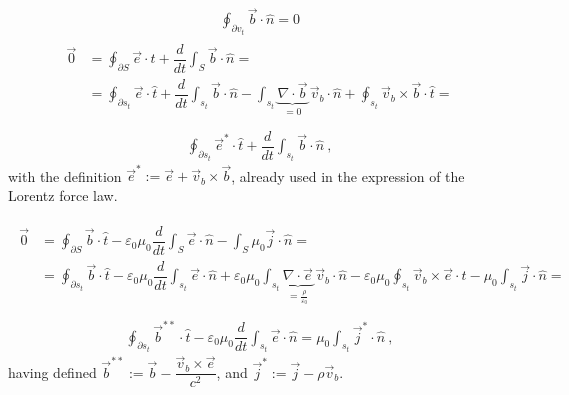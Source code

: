 \documentclass[letterpaper,10pt,english]{jupyterBook}
\begin{document}
\sphinxAtStartPar
{}
\begin{equation*}
\begin{split}
    \oint_{\partial v_t} \vec{b} \cdot \hat{n} = 0
\end{split}
\end{equation*}
\sphinxAtStartPar
{}
\begin{equation*}
\begin{split}\begin{aligned}
   \vec{0} & = \oint_{\partial S} \vec{e} \cdot \hat{t} + \dfrac{d}{dt} \int_{S} \vec{b} \cdot \hat{n} = \\
    & = \oint_{\partial s_t} \vec{e} \cdot \hat{t} + \dfrac{d}{dt} \int_{s_t} \vec{b} \cdot \hat{n} - \int_{s_t} \underbrace{\nabla \cdot \vec{b}}_{=0} \, \vec{v}_b \cdot \hat{n} + \oint_{s_t} \vec{v}_b \times \vec{b} \cdot \hat{t} =  \\
\end{aligned}\end{split}
\end{equation*}\begin{equation*}
\begin{split}
    \oint_{\partial s_t} \vec{e}^* \cdot \hat{t} + \dfrac{d}{dt} \int_{s_t} \vec{b} \cdot \hat{n} \ ,
\end{split}
\end{equation*}
\sphinxAtStartPar
with the definition \(\vec{e}^* := \vec{e} + \vec{v}_b \times \vec{b}\), already used in the expression of the Lorentz force law.

\sphinxAtStartPar
{}
\begin{equation*}
\begin{split}\begin{aligned}
    \vec{0} & = \oint_{\partial S} \vec{b} \cdot \hat{t} - \varepsilon_0 \mu_0 \dfrac{d}{dt} \int_{S}  \vec{e} \cdot \hat{n} - \int_{S} \mu_0 \vec{j} \cdot \hat{n} = \\
    & = \oint_{\partial s_t} \vec{b} \cdot \hat{t} - \varepsilon_0 \mu_0 \dfrac{d}{dt} \int_{s_t} \vec{e} \cdot \hat{n} + \varepsilon_0 \mu_0 \int_{s_t} \underbrace{\nabla \cdot \vec{e}}_{=\frac{\rho}{\varepsilon_0}} \, \vec{v}_b \cdot \hat{n} - \varepsilon_0 \mu_0 \oint_{s_t} \vec{v}_b \times \vec{e} \cdot \hat{t} -  \mu_0 \int_{s_t} \vec{j} \cdot \hat{n} =  \\
\end{aligned}\end{split}
\end{equation*}\begin{equation*}
\begin{split}
    \oint_{\partial s_t} \vec{b}^{* *} \cdot \hat{t} - \varepsilon_0 \mu_0 \dfrac{d}{dt} \int_{s_t} \vec{e} \cdot \hat{n} = \mu_0 \int_{s_t} \vec{j}^{*} \cdot \hat{n} \ ,
\end{split}
\end{equation*}
\sphinxAtStartPar
having defined \(\vec{b}^{* *} := \vec{b} - \dfrac{\vec{v}_b \times \vec{e}}{c^2}\), and \(\vec{j}^{*} := \vec{j} - \rho \vec{v}_b\).
\end{document}
